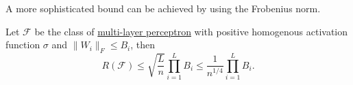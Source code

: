 A more sophisticated bound can be achieved by using the Frobenius norm.

\begin{theorem}
	Let \(\mathscr{F} \) be the class of \hyperref[def:MLP]{multi-layer perceptron} with positive homogenous activation function \(\sigma\) and \(\lVert W_i \rVert _F \leq B_i\), then
	\[
		R(\mathscr{F} ) \leq \sqrt{\frac{L}{n}} \prod _{i=1}^{L} B_i \leq \frac{1}{n^{1 / 4}} \prod _{i=1}^{L} B_i .
	\]
\end{theorem}